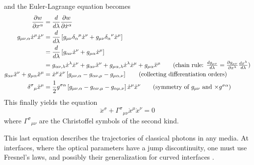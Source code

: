 and the Euler-Lagrange equation becomes
  \begin{align*}
  \frac{\partial w}{\partial x^\alpha}			&= \frac{d}{d\lambda}\frac{\partial w}{\partial\dot{x}^\alpha}	\\
  g_{\mu\nu,\alpha}\dot{x}^\mu\dot{x}^\nu		&= \frac{d}{d\lambda}\left[g_{\mu\nu}{\delta_\alpha}^\mu\dot{x}^\nu+g_{\mu\nu}{\delta_\alpha}^\nu\dot{x}^\mu\right]	\\
							&= \frac{d}{d\lambda}\left[g_{\alpha\nu}\dot{x}^\nu+g_{\mu\alpha}\dot{x}^\mu\right]					\\
							&= g_{\alpha\nu,\lambda}\dot{x}^\lambda\dot{x}^\nu+g_{\alpha\nu}\ddot{x}^\nu+g_{\mu\alpha,\lambda}\dot{x}^\lambda\dot{x}^\mu+g_{\mu\alpha}\ddot{x}^\mu \tag{chain rule: $\frac{dg_{\mu\nu}}{d\lambda}=\frac{\partial g_{\mu\nu}}{\partial x^\lambda}\frac{dx^\lambda}{d\lambda}$}	\\
  g_{\alpha\nu}\ddot{x}^\nu+g_{\mu\alpha}\ddot{x}^\mu	&= \dot{x}^\mu\dot{x}^\nu\left[g_{\mu\nu,\alpha}-g_{\alpha\nu,\mu}-g_{\mu\alpha,\nu}\right]	\tag{collecting differentiation orders}	\\
  {\delta^\sigma}_\mu\ddot{x}^\mu			&= \frac{1}{2}g^{\sigma\alpha}\left[g_{\mu\nu,\alpha}-g_{\alpha\nu,\mu}-g_{\alpha\mu,\nu}\right]\dot{x}^\mu\dot{x}^\nu	\tag{symmetry of $g_{\mu\nu}$ and $\times g^{\sigma\alpha}$}
  \end{align*}
This finally yields the equation
  \begin{equation}
   \ddot{x}^\sigma + {\Gamma^\sigma}_{\mu\nu}\dot{x}^\mu\dot{x}^\nu=0
  \end{equation}
where ${\Gamma^\sigma}_{\mu\nu}$ are the Christoffel symbols of the second kind. 

This last equation describes the trajectories of classical photons in any media. 
At interfaces, where the optical parameters have a jump discontinuity, one must use
Fresnel's laws, and possibly their generalization for curved interfaces \cite{HEN2002a}.

